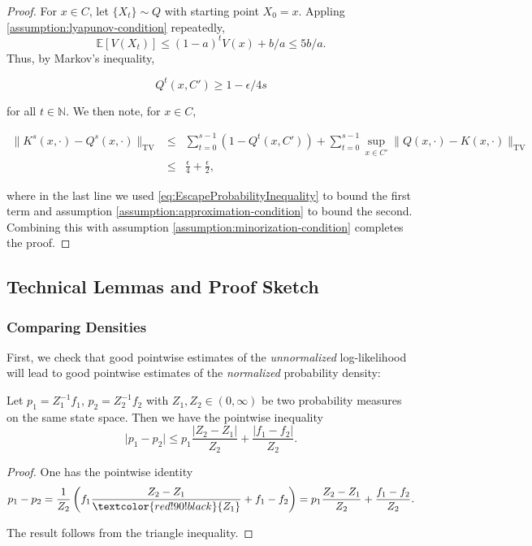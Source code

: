 \begin{proof}
For $x \in C$, let $\{X_{t}\} \sim Q$ with starting point $X_{0} = x$. Appling \ref{assumption:lyapunov-condition} repeatedly, $$\mathbb{E}[V(X_{t})] \leq (1-a)^{t} V(x) + b/a \leq 5b/a.$$  Thus, by Markov's inequality,

\begin{equation}
  Q^{t}(x,C') \geq 1 - \epsilon/4s
  \label{eq:EscapeProbabilityInequality}
\end{equation}

\noindent for all $t \in \mathbb{N}$. We then note, for $x \in C$,

\begin{eqnarray}
  \| K^{s}(x,\cdot) - Q^{s}(x,\cdot) \|_{\mathrm{TV}} &\leq& \sum_{t=0}^{s-1} (1 - Q^{t}(x,C')) + \sum_{t=0}^{s-1} \sup_{x \in C'} \| Q(x,\cdot) - K(x,\cdot) \|_{\mathrm{TV}} \\
  &\leq& \frac{\epsilon}{4} + \frac{\epsilon}{2},
\end{eqnarray}

\noindent where in the last line we used \eqref{eq:EscapeProbabilityInequality} to bound the first term and assumption \ref{assumption:approximation-condition} to bound the second.  Combining this with assumption \ref{assumption:minorization-condition} completes the proof.
\end{proof}

\subsection*{Technical Lemmas and Proof Sketch}

\subsubsection*{Comparing Densities}
First, we check that good pointwise estimates of the \textit{unnormalized} log-likelihood will lead to good pointwise estimates of the \textit{normalized} probability density:

\begin{lemma}
Let $p_1 = Z_1^{-1} f_1$, $p_2 = Z_2^{-1} f_2$ with $Z_{1}, Z_{2} \in (0, \infty)$ be two probability measures on the same state space. Then we have the pointwise inequality $$\vert p_1 - p_2 \vert \leq p_1 \frac{\vert Z_2 - Z_1 \vert }{Z_{2}} + \frac{|f_1 - f_2|}{Z_2}.$$
\label{lem:LemmaCloseNorm}
\end{lemma}
\begin{proof}
One has the pointwise identity $$p_1 - p_2 = \frac{1}{Z_{2}} \left( f_1 \frac{Z_{2} - Z_{1}}{\textcolor{red!90!black}{Z_{1}}} + f_{1} - f_{2} \right) = p_1 \frac{Z_{2} - Z_{1}}{Z_{2}} + \frac{f_{1} - f_{2}}{Z_{2}}.$$

The result follows from the triangle inequality.
\end{proof}

